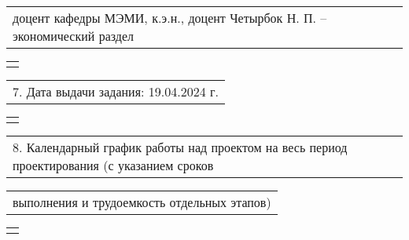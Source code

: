 \documentclass[12pt, А4, twoside]{article}
\begin{document}
\begin{FlushLeft}
    \vspace{-0.1 cm}

    \begin{tabular}{p{17.25cm}}
        \hspace{0.3cm} \textsf{доцент кафедры МЭМИ, к.э.н., доцент Четырбок Н. П.} \hspace{0.5cm} \textsf{{--} экономический раздел}\vspace{0pt} \hline \\
    \end{tabular}

    \begin{tabular}{p{17.25cm}}
        \vspace{0pt} \hline \\
    \end{tabular}

    \vspace{-0.1 cm}

    \begin{tabular}{p{17.25cm}}
        \textsf{7. Дата выдачи задания: 19.04.2024 г.} \vspace{0pt} \hline \\
    \end{tabular}

    \begin{tabular}{p{17.25cm}}
        \vspace{0pt} \hline \\
    \end{tabular}

    \vspace{-0.1 cm}

    \begin{tabular}{p{17.25cm}}
        \textsf{8. Календарный график работы над проектом на весь период проектирования (с указанием сроков} \vspace{0pt} \hline \\
    \end{tabular}

    \vspace{-0.1 cm}

    \begin{tabular}{p{17.25cm}}
        \textsf{выполнения и трудоемкость отдельных этапов)} \vspace{0pt} \hline \\
    \end{tabular}

    \begin{tabular}{p{17.25cm}}
        \vspace{0pt} \hline \\
    \end{tabular}


\end{FlushLeft}
\end{document}
